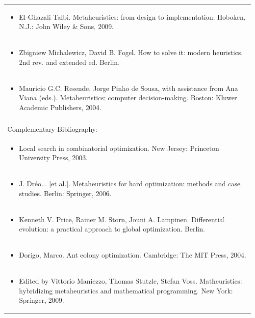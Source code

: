 \documentclass[11pt]{article}
\begin{document}
\begin{center}
\begin{longtable}{|p{4cm}|p{4cm}|p{4cm}|p{4cm}|}
\multicolumn{4}{|p{\dimexpr 16cm + 6\tabcolsep\relax}|}{\begin{itemize}\item El-Ghazali Talbi. Metaheuristics: from design to implementation. Hoboken, N.J.: John Wiley \& Sons, 2009.\end{itemize}}\\
\multicolumn{4}{|p{\dimexpr 16cm + 6\tabcolsep\relax}|}{\begin{itemize}\item Zbigniew Michalewicz, David B. Fogel. How to solve it: modern heuristics. 2nd rev. and extended ed. Berlin.\end{itemize}}\\
\multicolumn{4}{|p{\dimexpr 16cm + 6\tabcolsep\relax}|}{\begin{itemize}\item Mauricio G.C. Resende, Jorge Pinho de Sousa, with assistance from Ana Viana (eds.). Metaheuristics: computer decision-making. Boston: Kluwer Academic Publishers, 2004.\end{itemize}}\\
\multicolumn{4}{|p{16cm}|}{}\\
\hline
\multicolumn{4}{|p{16cm}|}{Complementary Bibliography:}\\*
\multicolumn{4}{|p{\dimexpr 16cm + 6\tabcolsep\relax}|}{\begin{itemize}\item Local search in combinatorial optimization. New Jersey: Princeton University Press, 2003.\end{itemize}}\\
\multicolumn{4}{|p{\dimexpr 16cm + 6\tabcolsep\relax}|}{\begin{itemize}\item J. Dréo... [et al.]. Metaheuristics for hard optimization: methods and case studies. Berlin: Springer, 2006.\end{itemize}}\\
\multicolumn{4}{|p{\dimexpr 16cm + 6\tabcolsep\relax}|}{\begin{itemize}\item Kenneth V. Price, Rainer M. Storn, Jouni A. Lampinen. Differential evolution: a practical approach to global optimization. Berlin.\end{itemize}}\\
\multicolumn{4}{|p{\dimexpr 16cm + 6\tabcolsep\relax}|}{\begin{itemize}\item Dorigo, Marco. Ant colony optimization. Cambridge: The MIT Press, 2004.\end{itemize}}\\
\multicolumn{4}{|p{\dimexpr 16cm + 6\tabcolsep\relax}|}{\begin{itemize}\item Edited by Vittorio Maniezzo, Thomas Stutzle, Stefan Voss. Matheuristics: hybridizing metaheuristics and mathematical programming. New York: Springer, 2009.\end{itemize}}\\
\hline
\end{longtable}
\end{center}
\end{document}
